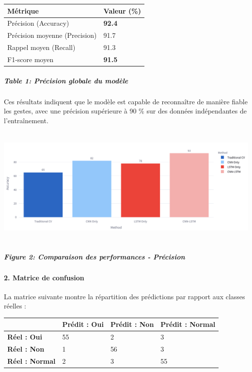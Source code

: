 \documentclass[
]{article}
\begin{document}
\begin{longtable}[]{@{}ll@{}}
\toprule
\textbf{Métrique} & \textbf{Valeur (\%)} \\
\midrule
\endhead
Précision (Accuracy) & \textbf{92.4} \\
Précision moyenne (Precision) & 91.7 \\
Rappel moyen (Recall) & 91.3 \\
F1-score moyen & \textbf{91.5} \\
\bottomrule
\end{longtable}

\hypertarget{table-1-pruxe9cision-globale-du-moduxe8le}{%
\subparagraph{Table 1: Précision globale du modèle}\label{table-1-pruxe9cision-globale-du-moduxe8le}}

Ces résultats indiquent que le modèle est capable de reconnaître de manière fiable les gestes, avec une précision supérieure à 90 \% sur des données indépendantes de l'entraînement.

\includegraphics[width=6.5in,height=2.33333in]{229856a5-a882-4d96-8360-24911cd95538_media/media/image1.png}

\hypertarget{figure-2-comparaison-des-performances---pruxe9cision}{%
\subparagraph{Figure 2: Comparaison des performances - Précision}\label{figure-2-comparaison-des-performances---pruxe9cision}}

\hypertarget{matrice-de-confusion}{%
\paragraph{\texorpdfstring{\textbf{2. Matrice de confusion}}{2. Matrice de confusion}}\label{matrice-de-confusion}}

La matrice suivante montre la répartition des prédictions par rapport aux classes réelles :

\begin{longtable}[]{@{}llll@{}}
\toprule
& \textbf{Prédit : Oui} & \textbf{Prédit : Non} & \textbf{Prédit : Normal} \\
\midrule
\endhead
\textbf{Réel : Oui} & 55 & 2 & 3 \\
\textbf{Réel : Non} & 1 & 56 & 3 \\
\textbf{Réel : Normal} & 2 & 3 & 55 \\
\bottomrule
\end{longtable}
\end{document}
